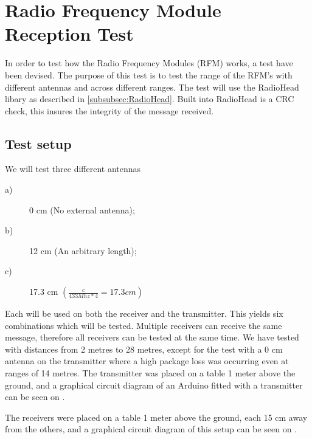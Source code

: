 

\section{Radio Frequency Module Reception Test}\label{subsec:RFMT}
In order to test how the Radio Frequency Modules (RFM) works, a test have been devised. 
The purpose of this test is to test the range of the RFM's with different antennas and across different ranges. 
The test will use the RadioHead libary as described in \ref{subsubsec:RadioHead}. 
Built into RadioHead is a CRC check, this insures the integrity of the message received. 

\subsection{Test setup}
We will test three different antennas 
\begin{description}
    \item[a)] 0 cm (No external antenna);
    \item[b)] 12 cm (An arbitrary length);
    \item[c)] 17.3 cm $(\frac{c}{433 Mhz * 4} = 17.3 cm)$
\end{description}
Each will be used on both the receiver and the transmitter. 
This yields six combinations which will be tested. 
Multiple receivers can receive the same message, therefore all receivers can be tested at the same time. 
We have tested with distances from 2 metres to 28 metres, except for the test with a 0 cm antenna on the transmitter where a high package loss was occurring even at ranges of 14 metres.
The transmitter was placed on a table 1 meter above the ground, and a graphical circuit diagram of an Arduino fitted with a transmitter can be seen on .


The receivers were placed on a table 1 meter above the ground, each 15 cm away from the others, and a graphical circuit diagram of this setup can be seen on .

